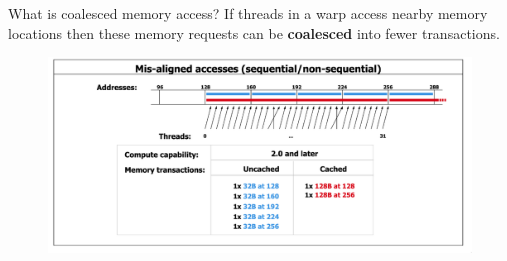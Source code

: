 \documentclass[9pt]{beamer}
\begin{document}
\begin{frame}[t]{What is coalesced memory access?}
If threads in a warp access nearby memory locations then these memory requests can be \textbf{coalesced} into fewer transactions\cite{nv_prog_guide}. 

\bigskip 

\begin{figure}
\begin{center}
\includegraphics[scale=0.35]{images/coalesced_memory_unaligned.png} %
\end{center}
\end{figure}

\end{frame}
\end{document}
